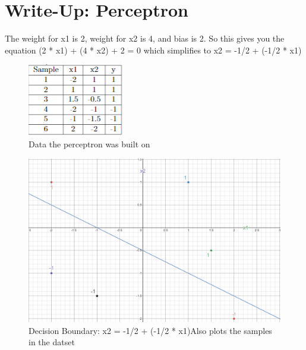 \documentclass{article}
\begin{document}
\section{Write-Up: Perceptron}
The weight for x1 is 2, weight for x2 is 4, and bias is 2. So this gives you the equation (2 * x1) + (4 * x2) + 2 = 0 which simplifies to x2 = -1/2 + (-1/2 * x1)

\begin{figure}[h!]
\centering
\includegraphics[scale=0.75]{perceptron_table.PNG}
\caption{Data the perceptron was built on}
\end{figure}


\begin{figure}[h!]
\centering
\includegraphics[scale=0.5]{perceptron.PNG}
\caption{Decision Boundary: x2 = -1/2 + (-1/2 * x1)\newline Also plots the samples in the datset}
\end{figure}
\end{document}
